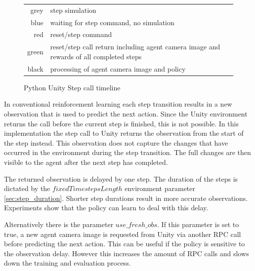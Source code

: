 \begin{figure}[h]
    \begin{tabular}{r@{: }l}
        grey & step simulation                                    \\
        blue & waiting for step command, no simulation \\
        red  & reset/step command\\
        green  & reset/step call return including agent camera image and rewards of all completed steps \\
        black & processing of agent camera image and policy \\
    \end{tabular}
    \caption{Python Unity Step call timeline}
    \label{fig:step_call_timeline}
\end{figure}

In conventional reinforcement learning each step transition results in a new observation that is used to predict the next action. Since the Unity environment returns the call before the current step is finished, this is not possible. In this implementation the step call to Unity returns the observation from the start of the step instead. This observation does not capture the changes that have occurred in the environment during the step transition. The full changes are then visible to the agent after the next step has completed. 

The returned observation is delayed by one step. The duration of the steps is dictated by the $fixedTimestepsLength$ environment parameter \ref{sec:step_duration}. Shorter step durations result in more accurate observations.
Experiments show that the policy can learn to deal with this delay.

Alternatively there is the parameter $use\_fresh\_obs$. If this parameter is set to true, a new agent camera image is requested from Unity via another \ac{RPC} call before predicting the next action. This can be useful if the policy is sensitive to the observation delay. However this increases the amount of \ac{RPC} calls and slows down the training and evaluation process.



